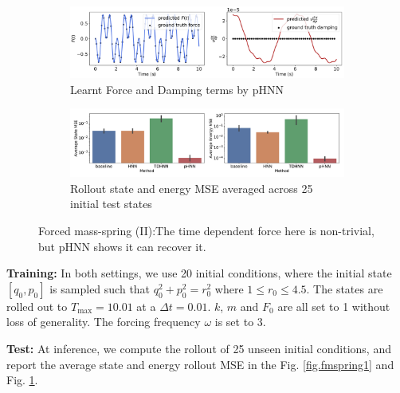 \documentclass{article}
\begin{document}
\begin{figure}[h!]
\centering
\captionsetup{justification=centering}
	\begin{subfigure}[b]{0.48\textwidth}
		\centering
		\includegraphics[width=\textwidth]{figures/figures/forced_mass_spring/2/forced_mass_spring_dpdt_new_0.pdf}
		\caption{Learnt Force and Damping terms by pHNN}
	\end{subfigure}
	\begin{subfigure}[b]{0.48\textwidth}
	    \centering
		\includegraphics[width=\textwidth]{figures/figures/forced_mass_spring/2/forced_mass_spring_errors_0.pdf}
		\caption{Rollout state and energy MSE averaged across 25 initial test states}
	\end{subfigure}
\caption{Forced mass-spring (II):The time dependent force here is non-trivial, but pHNN shows it can recover it.}
\label{fig.fmspring2}
\end{figure}
\textbf{Training:} In both settings, we use 20 initial conditions, where the initial state $[q_0,p_0]$ is sampled such that $q_0^2 +p_0^2 =r_0^2$ where $1 \leq r_0 \leq 4.5$. The states are rolled out to $T_{\max}=10.01$ at a $\Delta t = 0.01$. $k$, $m$ and $F_0$ are all set to 1 without loss of generality. The forcing frequency $\omega$ is set to 3. 

\textbf{Test:} At inference, we compute the rollout of 25 unseen initial conditions, and report the average state and energy rollout MSE in the Fig. \ref{fig.fmspring1} and Fig. \ref{fig.fmspring2}.
\end{document}

